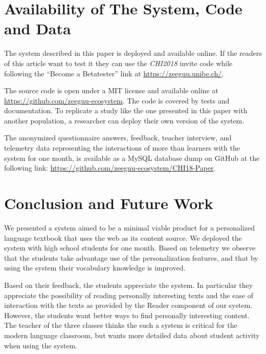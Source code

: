 \section{Availability of The System, Code and Data}

The system described in this paper is deployed and available online. If the readers of this article want to test it they can use the {\em CHI2018} invite code while following the  ``Become a Betatester'' link at \url{https://zeeguu.unibe.ch/}.

The source code is open under a MIT license and available online at \url{https://github.com/zeeguu-ecosystem}. The code is covered by tests and documentation. To replicate a study like the one presented in this paper with another population, a researcher can deploy their own version of the system. 

The anonymized questionnaire answers, feedback, teacher interview, and telemetry data representing the interactions of more than \students learners with the system for one month, is available as a MySQL database dump on GitHub at the following link: \url{https://github.com/zeeguu-ecosystem/CHI18-Paper}. 





\section{Conclusion and Future Work}
We presented a system aimed to be a minimal viable product for a personalized language textbook that uses the web as its content source. We deployed the system with \studs high school students for one month. Based on telemetry we observe that the students take advantage use of the personalization features, and that by using the system their vocabulary knowledge is improved. 

Based on their feedback, the students appreciate the system. In particular they appreciate the possibility of reading personally interesting texts and the ease of interaction with the texts as provided by the Reader component of our system. However, the students want better ways to find personally interesting content. The teacher of the three classes thinks the such a system is critical for the modern language classroom, but wants more detailed data about student activity when using the system.

